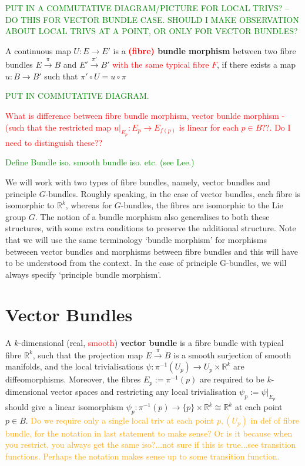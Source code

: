 \documentclass[a4paper]{article}
\theoremstyle{definition} \newtheorem*{definition}{Definition}
\theoremstyle{definition} \newtheorem*{definitions}{Definitions}
\theoremstyle{plain} \newtheorem{theorem}{Theorem}[section]
\theoremstyle{plain} \newtheorem{proposition}[theorem]{Proposition}
\theoremstyle{plain} \newtheorem{corollary}[theorem]{Corollary}
\theoremstyle{plain} \newtheorem{lemma}[theorem]{Lemma}
\theoremstyle{plain} \newtheorem{example}[theorem]{Example}
\newcommand{\checkCorrect}[1]{\textcolor{red}{#1}}
\newcommand{\question}[1]{\textcolor{orange}{#1}}
\newcommand{\finish}[1]{\textcolor{green}{#1}}
\newcommand{\defn}[1]{\textbf{#1}}
\newcommand{\realnos}{\mathbb{R}}
\newcommand{\canonicaliso}{\cong}
\begin{document}
\finish{PUT IN A COMMUTATIVE DIAGRAM/PICTURE FOR LOCAL TRIVS? -- DO THIS FOR VECTOR BUNDLE CASE. SHOULD I MAKE OBSERVATION ABOUT LOCAL TRIVS AT A POINT, OR ONLY FOR VECTOR BUNDLES?}

A continuous map $U:E\rightarrow E'$ is a \defn{\checkCorrect{(fibre)} bundle morphism} between two fibre bundles $E\xrightarrow{\pi} B$ and $E'\xrightarrow{\pi'} B'$ \checkCorrect{with the same typical fibre $F$}, if there exists a map $u:B\rightarrow B'$ such that $\pi' \circ U = u \circ \pi$

\finish{PUT IN COMMUTATIVE DIAGRAM.}

\checkCorrect{What is difference between fibre bundle morphism, vector bunlde morphism - (such that the restricted map $u\vert_{E_p}: E_p \rightarrow E_{f(p)}$ is linear for each $p\in B$??. Do I need to distinguish these??}

\finish{Define Bundle iso. smooth bundle iso. etc. (see Lee.)}

We will work with two types of fibre bundles, namely, vector bundles and principle $G$-bundles. Roughly speaking, in the case of vector bundles, each fibre is isomorphic to $\realnos^k$, whereas for $G$-bundles, the fibres are isomorphic to the Lie group $G$. The notion of a bundle morphism also generalises to both these structures, with some extra conditions to preserve the additional structure. Note that we will use the same terminology `bundle morphism' for morphisms betweeen vector bundles and morphisms between fibre bundles and this will have to be understood from the context. In the case of principle G-bundles, we will always specify `principle bundle morphism'.

\section{Vector Bundles}
A $k$-dimensional (real, \checkCorrect{smooth}) \defn{vector bundle} is a fibre bundle with typical fibre $\realnos^k$, such that the projection map $E\xrightarrow{\pi} B$ is a smooth surjection of smooth manifolds, and the local trivialisations $\psi:\pi^{-1}(U_p) \rightarrow U_p \times \realnos^k$ are diffeomorphisms. Moreover, the fibres $E_p:=\pi^{-1}(p)$ are required to be $k$-dimensional vector spaces and restricting any local trivialisation $\psi_p:=\psi \vert_{E_p}$ should give a linear isomorphism $\psi_p:\pi^{-1}(p)\rightarrow \{p\} \times \realnos^k \canonicaliso \realnos^k$ at each point $p\in B$. \question{Do we require only a single local triv at each point $p, (U_p)$ in def of fibre bundle, for the notation in last statement to make sense? Or is it because when you restrict, you always get the same iso?...not sure if this is true...see transition functions. Perhaps the notation makes sense up to some transition function.}
\end{document}
